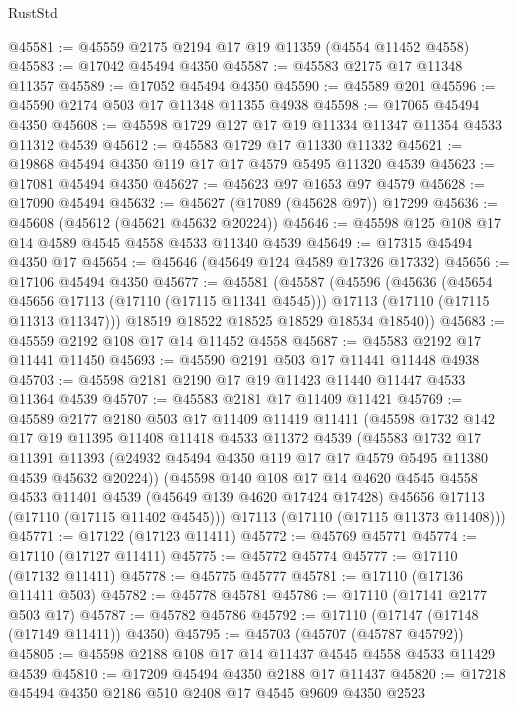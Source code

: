 \begin{lexlean}{RustStd}
\begin{coremodule}
@45581 := @45559 @2175 @2194 @17 @19 @11359 (@4554 @11452 @4558)
@45583 := @17042 @45494 @4350
@45587 := @45583 @2175 @17 @11348 @11357
@45589 := @17052 @45494 @4350
@45590 := @45589 @201
@45596 := @45590 @2174 @503 @17 @11348 @11355 @4938
@45598 := @17065 @45494 @4350
@45608 := @45598 @1729 @127 @17 @19 @11334 @11347 @11354 @4533 @11312 @4539
@45612 := @45583 @1729 @17 @11330 @11332
@45621 := @19868 @45494 @4350 @119 @17 @17 @4579 @5495 @11320 @4539
@45623 := @17081 @45494 @4350
@45627 := @45623 @97 @1653 @97 @4579
@45628 := @17090 @45494
@45632 := @45627 (@17089 (@45628 @97)) @17299
@45636 := @45608 (@45612 (@45621 @45632 @20224))
@45646 := @45598 @125 @108 @17 @14 @4589 @4545 @4558 @4533 @11340 @4539
@45649 := @17315 @45494 @4350 @17
@45654 := @45646 (@45649 @124 @4589 @17326 @17332)
@45656 := @17106 @45494 @4350
@45677 := @45581
    (@45587
      (@45596
        (@45636
          (@45654 @45656 @17113 (@17110 (@17115 @11341 @4545)))
          @17113
          (@17110 (@17115 @11313 @11347)))
        @18519
        @18522
        @18525
        @18529
        @18534
        @18540))
@45683 := @45559 @2192 @108 @17 @14 @11452 @4558
@45687 := @45583 @2192 @17 @11441 @11450
@45693 := @45590 @2191 @503 @17 @11441 @11448 @4938
@45703 := @45598 @2181 @2190 @17 @19 @11423 @11440 @11447 @4533 @11364 @4539
@45707 := @45583 @2181 @17 @11409 @11421
@45769 := @45589
    @2177
    @2180
    @503
    @17
    @11409
    @11419
    @11411
    (@45598
      @1732
      @142
      @17
      @19
      @11395
      @11408
      @11418
      @4533
      @11372
      @4539
      (@45583
        @1732
        @17
        @11391
        @11393
        (@24932 @45494 @4350 @119 @17 @17 @4579 @5495 @11380 @4539 @45632 @20224))
      (@45598
        @140
        @108
        @17
        @14
        @4620
        @4545
        @4558
        @4533
        @11401
        @4539
        (@45649 @139 @4620 @17424 @17428)
        @45656
        @17113
        (@17110 (@17115 @11402 @4545)))
      @17113
      (@17110 (@17115 @11373 @11408)))
@45771 := @17122 (@17123 @11411)
@45772 := @45769 @45771
@45774 := @17110 (@17127 @11411)
@45775 := @45772 @45774
@45777 := @17110 (@17132 @11411)
@45778 := @45775 @45777
@45781 := @17110 (@17136 @11411 @503)
@45782 := @45778 @45781
@45786 := @17110 (@17141 @2177 @503 @17)
@45787 := @45782 @45786
@45792 := @17110 (@17147 (@17148 (@17149 @11411)) @4350)
@45795 := @45703 (@45707 (@45787 @45792))
@45805 := @45598 @2188 @108 @17 @14 @11437 @4545 @4558 @4533 @11429 @4539
@45810 := @17209 @45494 @4350 @2188 @17 @11437
@45820 := @17218 @45494 @4350 @2186 @510 @2408 @17 @4545 @9609 @4350 @2523

\end{coremodule}
\end{lexlean}
